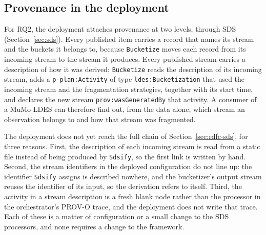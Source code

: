 \subsection{Provenance in the deployment}

For RQ2, the deployment attaches provenance at two levels, through SDS (Section~\ref{sec:sds}).
Every published item carries a record that names its stream and the buckets it belongs to,
because \texttt{Bucketize} moves each record from its incoming stream to the stream it produces.
Every published stream carries a description of how it was derived:
\texttt{Bucketize} reads the description of its incoming stream,
adds a \texttt{p-plan:Activity} of type \texttt{ldes:Bucketization}
that used the incoming stream and the fragmentation strategies, together with its start time,
and declares the new stream \texttt{prov:wasGeneratedBy} that activity.
A consumer of a MuMo LDES can therefore find out,
from the data alone, which stream an observation belongs to and how that stream was fragmented.

The deployment does not yet reach the full chain of Section~\ref{sec:rdfc-sds}, for three reasons.
First, the description of each incoming stream is read from a static file
instead of being produced by \texttt{Sdsify}, so the first link is written by hand.
Second, the stream identifiers in the deployed configuration do not line up:
the identifier \texttt{Sdsify} assigns is described nowhere,
and the bucketizer's output stream reuses the identifier of its input,
so the derivation refers to itself.
Third, the activity in a stream description is a fresh blank node
rather than the processor in the orchestrator's PROV-O trace,
and the deployment does not write that trace.
Each of these is a matter of configuration or a small change to the SDS processors,
and none requires a change to the framework.
